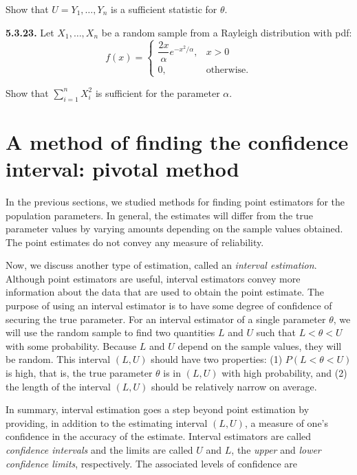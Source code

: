 Show that $U = Y_1, \ldots, Y_n$ is a sufficient statistic for $\theta$.

\textbf{5.3.23.} Let $X_1, \ldots, X_n$ be a random sample from a Rayleigh distribution with pdf:
$$f(x) = \begin{cases} \dfrac{2x}{\alpha} e^{-x^2/\alpha}, & x > 0 \\ 0, & \text{otherwise.} \end{cases}$$

Show that $\sum_{i=1}^{n} X_i^2$ is sufficient for the parameter $\alpha$.

\section{A method of finding the confidence interval: pivotal method}

In the previous sections, we studied methods for finding point estimators for the population parameters. In general, the estimates will differ from the true parameter values by varying amounts depending on the sample values obtained. The point estimates do not convey any measure of reliability.

Now, we discuss another type of estimation, called an \textit{interval estimation}. Although point estimators are useful, interval estimators convey more information about the data that are used to obtain the point estimate. The purpose of using an interval estimator is to have some degree of confidence of securing the true parameter. For an interval estimator of a single parameter $\theta$, we will use the random sample to find two quantities $L$ and $U$ such that $L < \theta < U$ with some probability. Because $L$ and $U$ depend on the sample values, they will be random. This interval $(L, U)$ should have two properties: (1) $P(L < \theta < U)$ is high, that is, the true parameter $\theta$ is in $(L, U)$ with high probability, and (2) the length of the interval $(L, U)$ should be relatively narrow on average.

In summary, interval estimation goes a step beyond point estimation by providing, in addition to the estimating interval $(L, U)$, a measure of one's confidence in the accuracy of the estimate. Interval estimators are called \textit{confidence intervals} and the limits are called $U$ and $L$, the \textit{upper} and \textit{lower confidence limits}, respectively. The associated levels of confidence are
